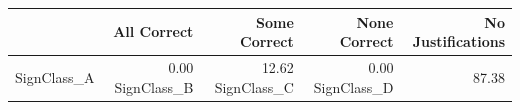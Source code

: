 \begin{tabular}{lrrrr}
\toprule
 & All Correct & Some Correct & None Correct & No Justifications \\
\midrule
SignClass_A & 0.00%
SignClass_B & 12.62%
SignClass_C & 0.00%
SignClass_D & 87.38%
\bottomrule
\end{tabular}
